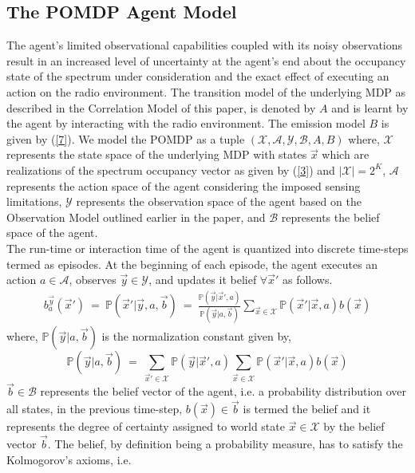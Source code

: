 \documentclass[conference]{IEEEtran}
\begin{document}
\subsection{The POMDP Agent Model}
The agent's limited observational capabilities coupled with its noisy observations result in an increased level of uncertainty at the agent's end about the occupancy state of the spectrum under consideration and the exact effect of executing an action on the radio environment. The transition model of the underlying MDP as described in the Correlation Model of this paper, is denoted by $A$ and is learnt by the agent by interacting with the radio environment. The emission model $B$ is given by (\ref{7}).
We model the POMDP as a tuple $(\mathcal{X},\mathcal{A},\mathcal{Y},\mathcal{B},A,B)$ where, $\mathcal{X}$ represents the state space of the underlying MDP with states $\vec{x}$ which are realizations of the spectrum occupancy vector as given by (\ref{3}) and $|\mathcal{X}|=2^K$, $\mathcal{A}$ represents the action space of the agent considering the imposed sensing limitations, $\mathcal{Y}$ represents the observation space of the agent based on the Observation Model outlined earlier in the paper, and $\mathcal{B}$ represents the belief space of the agent.
\\The run-time or interaction time of the agent is quantized into discrete time-steps termed as episodes. At the beginning of each episode, the agent executes an action $a \in \mathcal{A}$, observes $\vec{y} \in \mathcal{Y}$, and updates it belief $\forall \vec{x}'$ as follows.
\begin{equation}\label{8}
    \begin{aligned}
        b_a^{\vec{y}}(\vec{x}')\ =\ \mathbb{P}(\vec{x}'|\vec{y},a,\vec{b})\ =\ \frac{\mathbb{P}(\vec{y}|\vec{x}',a)}{\mathbb{P}(\vec{y}|a,\vec{b})}\sum_{\vec{x} \in \mathcal{X}}\mathbb{P}(\vec{x}'|\vec{x},a)b(\vec{x})
    \end{aligned}
\end{equation}
where, $\mathbb{P}(\vec{y}|a,\vec{b})$ is the normalization constant given by,
\begin{equation}\label{9}
        \mathbb{P}(\vec{y}|a,\vec{b})\ =\ \sum_{\vec{x}' \in \mathcal{X}}\mathbb{P}(\vec{y}|\vec{x}',a)\sum_{\vec{x} \in \mathcal{X}}\mathbb{P}(\vec{x}'|\vec{x},a)b(\vec{x})
\end{equation}
$\vec{b} \in \mathcal{B}$ represents the belief vector of the agent, i.e. a probability distribution over all states, in the previous time-step,
$b(\vec{x}) \in \vec{b}$ is termed the belief and it represents the degree of certainty assigned to world state $\vec{x} \in \mathcal{X}$ by the belief vector $\vec{b}$. The belief, by definition being a probability measure, has to satisfy the Kolmogorov's axioms, i.e.
\end{document}
